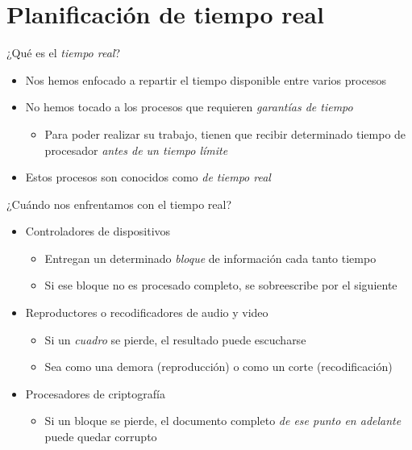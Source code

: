 \documentclass[presentation]{beamer}
\begin{document}
\section{Planificación de tiempo real}
\label{sec:orgd53a720}

\begin{frame}[label={sec:org8cdcb4b}]{¿Qué es el \emph{tiempo real}?}
\begin{itemize}
\item Nos hemos enfocado a repartir el tiempo disponible entre varios
procesos
\item No hemos tocado a los procesos que requieren \emph{garantías de tiempo}
\begin{itemize}
\item Para poder realizar su trabajo, tienen que recibir determinado
tiempo de procesador \emph{antes de un tiempo límite}
\end{itemize}
\item Estos procesos son conocidos como \emph{de tiempo real}
\end{itemize}
\end{frame}

\begin{frame}[label={sec:org0a36525}]{¿Cuándo nos enfrentamos con el tiempo real?}
\begin{itemize}
\item Controladores de dispositivos
\begin{itemize}
\item Entregan un determinado \emph{bloque} de información cada tanto tiempo
\item Si ese bloque no es procesado completo, se sobreescribe por el siguiente
\end{itemize}
\item Reproductores o recodificadores de audio y video
\begin{itemize}
\item Si un \emph{cuadro} se pierde, el resultado puede escucharse
\item Sea como una demora (reproducción) o como un corte (recodificación)
\end{itemize}
\item Procesadores de criptografía
\begin{itemize}
\item Si un bloque se pierde, el documento completo \emph{de ese punto en
adelante} puede quedar corrupto
\end{itemize}
\end{itemize}
\end{frame}
\end{document}
